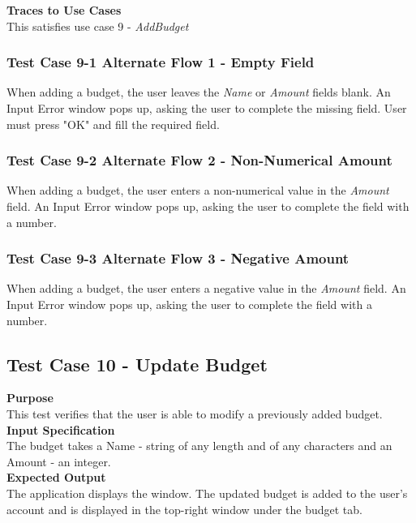 \documentclass[12pt]{article}
\begin{document}
\noindent
{\bf Traces to Use Cases}\\
This satisfies use case 9 - \textit{AddBudget}

\subsubsection
{Test Case 9-1 Alternate Flow 1 - Empty Field}
When adding a budget, the user leaves the \textit{Name} or \textit{Amount} fields blank.
An Input Error window pops up, asking the user to complete the missing field. User must press "OK" and fill the required field.

\subsubsection
{Test Case 9-2 Alternate Flow 2 - Non-Numerical Amount}
When adding a budget, the user enters a non-numerical value in the \textit{Amount} field. 
An Input Error window pops up, asking the user to complete the field with a number. 

\subsubsection
{Test Case 9-3 Alternate Flow 3 - Negative Amount}
When adding a budget, the user enters a negative value in the \textit{Amount} field. 
An Input Error window pops up, asking the user to complete the field with a number. 

\clearpage

\subsection{Test Case 10 - Update Budget} \label{TC-10}

{\bf Purpose}\\
This test verifies that the user is able to modify a previously added budget.   \\               

{\bf Input Specification}\\
The budget takes a Name - string of any length and of any characters
and an Amount - an integer.\\

\noindent
{\bf Expected Output}\\
The application displays the window.
The updated budget is added to the user's account and is displayed in the top-right window
under the budget tab.\\
\end{document}
